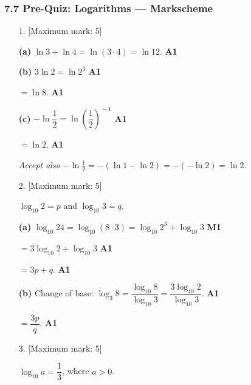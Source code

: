 \documentclass[12pt, twoside]{article}
\begin{document}
\subsubsection*{7.7 Pre-Quiz: Logarithms --- Markscheme}

\begin{enumerate}[itemsep=0.3cm]

\item[1.] [Maximum mark: 5]

\textbf{(a)} $\ln 3 + \ln 4 = \ln(3 \cdot 4) = \ln 12$. \hfill \textbf{A1}

\medskip

\textbf{(b)} $3\ln 2 = \ln 2^{3}$ \hfill \textbf{A1}

$= \ln 8$. \hfill \textbf{A1}

\medskip

\textbf{(c)} $-\ln\dfrac{1}{2} = \ln\!\left(\dfrac{1}{2}\right)^{\!-1}$ \hfill \textbf{A1}

$= \ln 2$. \hfill \textbf{A1}

\emph{Accept also $-\ln\tfrac{1}{2} = -(\ln 1 - \ln 2) = -(-\ln 2) = \ln 2$.}

\newpage

\item[2.] [Maximum mark: 5]

$\log_{10} 2 = p$ and $\log_{10} 3 = q$.

\medskip

\textbf{(a)} $\log_{10} 24 = \log_{10}(8 \cdot 3) = \log_{10} 2^{3} + \log_{10} 3$ \hfill \textbf{M1}

$= 3\log_{10} 2 + \log_{10} 3$ \hfill \textbf{A1}

$= 3p + q$. \hfill \textbf{A1}

\medskip

\textbf{(b)} Change of base:
$\log_{3} 8 = \dfrac{\log_{10} 8}{\log_{10} 3} = \dfrac{3\log_{10} 2}{\log_{10} 3}$. \hfill \textbf{A1}

$= \dfrac{3p}{q}$. \hfill \textbf{A1}

\newpage

\item[3.] [Maximum mark: 5]

$\log_{10} a = \dfrac{1}{3}$, where $a > 0$.

\medskip


\end{enumerate}
\end{document}
